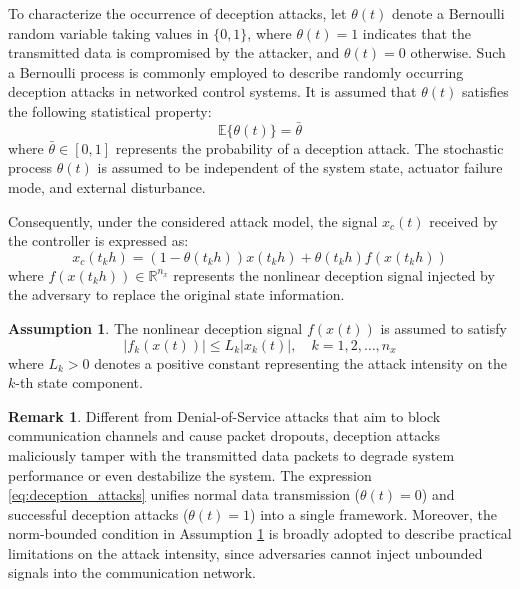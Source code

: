 \documentclass[preprint,review,fleqn,sort&compress,3p]{elsarticle}
\theoremstyle{definition} %
\theoremstyle{definition}%
\newtheorem{rem}{Remark}[section]
\newtheorem{asptn}{Assumption}[section]
\begin{document}
To characterize the occurrence of deception attacks, let $\theta(t)$ denote a Bernoulli random variable taking values in $\{0,1\}$, where $\theta(t)=1$ indicates that the transmitted data is compromised by the attacker, and $\theta(t) = 0$ otherwise. Such a Bernoulli process is commonly employed to describe randomly occurring deception attacks in networked control systems. It is assumed that $\theta(t)$ satisfies the following statistical property:
\begin{equation}
	\mathbb{E}\{\theta(t)\} = \bar{\theta} 
\end{equation}
where $\bar{\theta} \in [0,1]$ represents the probability of a deception attack.
The stochastic process $\theta(t)$ is assumed to be independent of the system state, actuator failure mode, and external disturbance.

Consequently, under the considered attack model, the signal $x_c(t)$ received by the controller is expressed as:
\begin{equation}\label{eq:deception_attacks}
	x_c(t_{k} h) = (1 - \theta(t_{k} h)) x(t_{k} h) + \theta(t_{k} h) f(x(t_{k} h))
\end{equation}
where $f(x(t_{k}h)) \in \mathbb{R}^{n_x}$ represents the nonlinear deception signal injected by the adversary to replace the original state information.

\begin{asptn} \label{assump:attack_bound}
The nonlinear deception signal $f(x(t))$ is assumed to satisfy
\begin{equation}
	|f_k(x(t))| \le L_k |x_k(t)|,\quad k = 1,2,\ldots,n_x
\end{equation}
where $L_k > 0$ denotes a positive constant representing the attack intensity on the $k$-th state component.
\end{asptn}
\begin{rem}
	Different from Denial-of-Service attacks that aim to block communication channels
	and cause packet dropouts, deception attacks maliciously tamper with the transmitted data packets to
	degrade system performance or even destabilize the system. The expression \eqref{eq:deception_attacks} unifies normal data transmission ($\theta(t) = 0$) and successful deception attacks ($\theta(t) = 1$) into
	a single framework. Moreover, the norm-bounded condition in Assumption \ref{assump:attack_bound} is broadly adopted to
	describe practical limitations on the attack intensity, since adversaries cannot inject unbounded signals
	into the communication network.
\end{rem}
\end{document}
